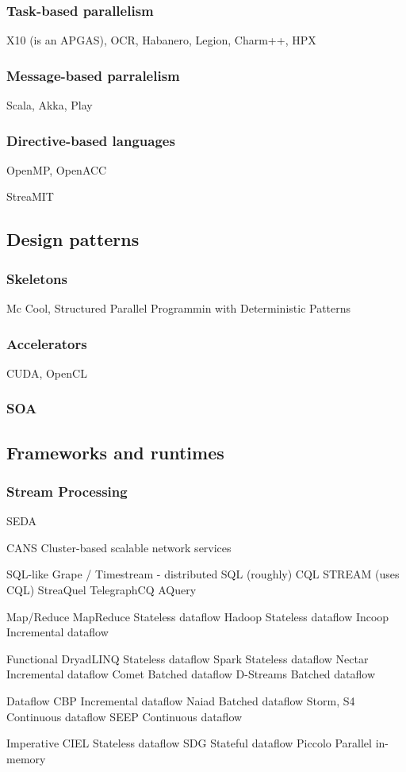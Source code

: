 \subsubsection{Task-based parallelism}
X10 (is an APGAS), OCR, Habanero, Legion, Charm++, HPX

\subsubsection{Message-based parralelism}
Scala, Akka, Play

\subsubsection{Directive-based languages}
OpenMP, OpenACC


StreaMIT



\subsection{Design patterns}

\subsubsection{Skeletons}
Mc Cool, Structured Parallel Programmin with Deterministic Patterns

\subsubsection{Accelerators}
CUDA, OpenCL

\subsubsection{SOA}



\subsection{Frameworks and runtimes}

\subsubsection{Stream Processing}

SEDA

CANS Cluster-based scalable network services

SQL-like
  Grape / Timestream - distributed SQL (roughly)
  CQL
  STREAM (uses CQL)
  StreaQuel
  TelegraphCQ
  AQuery

Map/Reduce
  MapReduce    Stateless dataflow
  Hadoop       Stateless dataflow
  Incoop       Incremental dataflow

Functional
  DryadLINQ    Stateless dataflow
  Spark        Stateless dataflow
  Nectar       Incremental dataflow
  Comet        Batched dataflow
  D-Streams    Batched dataflow

Dataflow
  CBP          Incremental dataflow
  Naiad        Batched dataflow
  Storm, S4    Continuous dataflow
  SEEP         Continuous dataflow

Imperative
  CIEL         Stateless dataflow
  SDG          Stateful dataflow
  Piccolo      Parallel in-memory